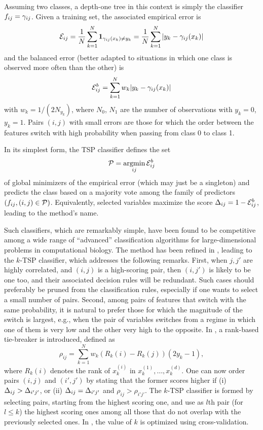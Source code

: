 Assuming two classes, a depth-one tree in this context is simply the classifier $f_{ij} = \gamma_{ij}$. Given a training set, the associated empirical error is 
\[
{\mathcal E}_{ij} = \frac1N \sum_{k=1}^N {\bm 1}_{\gamma_{ij}(x_k) \neq y_k} =\frac1N  \sum_{k=1}^N |y_k - \gamma_{ij}(x_k)|
\]
and the balanced error (better adapted to situations in which one class is observed more often than the other) is
\[
{\mathcal E}^b_{ij} = \sum_{k=1}^N w_k |y_k - \gamma_{ij}(x_k)|
\]
with $w_k = 1/(2N_{y_k})$, where $N_0$, $N_1$ are the number of observations with $y_k=0$, $y_k=1$. Pairs $(i,j)$ with small errors are those for which the order between the features switch with high probability when passing from class 0 to class 1.

In its simplest form, the TSP classifier defines the set
\[
{\mathcal P} = \operatorname*{argmin}_{ij} {\mathcal E}^b_{ij}
\]
of global minimizers of the empirical error (which may just be a singleton) and predicts the class based on a majority vote among the family of predictors  $(f_{ij}, (i,j) \in {\mathcal P})$. Equivalently, selected variables maximize the score $\Delta_{ij} = 1 - {\mathcal E}^b_{ij}$, leading to the method's name.

Such classifiers, which are remarkably simple, have been found to be competitive among a wide range of ``advanced'' classification algorithms for large-dimensional problems in computational biology. The method has been refined in \citet{tan2005simple}, leading to the $k$-TSP classifier, which addresses the following remarks.  First, when $j,j'$ are highly correlated, and $(i,j)$ is a high-scoring pair, then $(i,j')$ is likely to be one too, and their associated decision rules will be redundant. Such cases should preferably be pruned from the classification rules, especially if one wants to select a small number of pairs. Second, among pairs of features that switch with the same probability, it is natural to prefer those for which the magnitude of the switch is largest, e.g., when the pair of variables switches from a regime in which one of them is very low and the other very high to the opposite. In \citet{tan2005simple}, a rank-based tie-breaker is introduced, defined as
\[
\rho_{ij} = \sum_{k=1}^N w_k (R_k(i) - R_k(j))(2y_k-1),
\]
where $R_k(i)$ denotes the rank of $x_k^{(i)}$ in $x_k^{(1)}, \ldots, x_k^{(d)}$.
One can now order pairs $(i,j)$ and $(i', j')$ by stating that the former scores higher if (i) $\Delta_{ij} > \Delta_{i'j'}$, or (ii) $\Delta_{ij} =\Delta_{i'j'}$ and $\rho_{ij} > \rho_{i'j'}$. The $k$-TSP classifier is formed by selecting pairs, starting from the highest scoring one, and use as $l$th pair (for $l\leq k$)  the highest scoring ones among all those that do not overlap with the previously selected ones. In \cite{tan2005simple}, the value of $k$ is optimized using cross-validation. 

